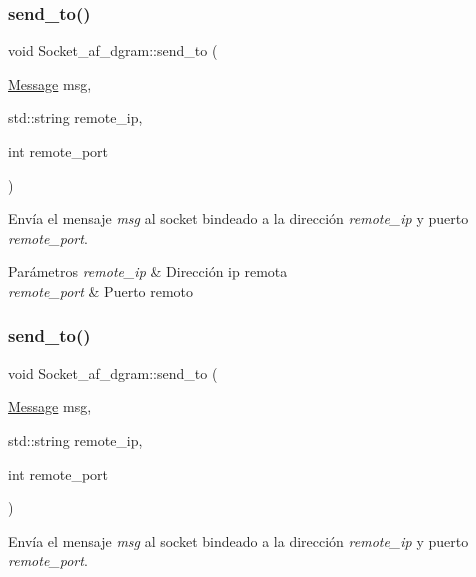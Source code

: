 \subsubsection{\texorpdfstring{send\+\_\+to()}{send\_to()}\hspace{0.1cm}{\footnotesize\ttfamily [1/2]}}
{\footnotesize\ttfamily void Socket\+\_\+af\+\_\+dgram\+::send\+\_\+to (\begin{DoxyParamCaption}\item[{\hyperlink{structMessage}{Message}}]{msg,  }\item[{std\+::string}]{remote\+\_\+ip,  }\item[{int}]{remote\+\_\+port }\end{DoxyParamCaption})}



Envía el mensaje {\itshape msg} al socket bindeado a la dirección {\itshape remote\+\_\+ip} y puerto {\itshape remote\+\_\+port}. 


\begin{DoxyParams}{Parámetros}
{\em remote\+\_\+ip} & Dirección ip remota \\
\hline
{\em remote\+\_\+port} & Puerto remoto \\
\hline
\end{DoxyParams}
\mbox{\label{classSocket__af__dgram_a744bb661eeebe5b5cdfca0028da6bd88}} 
\subsubsection{\texorpdfstring{send\+\_\+to()}{send\_to()}\hspace{0.1cm}{\footnotesize\ttfamily [2/2]}}
{\footnotesize\ttfamily void Socket\+\_\+af\+\_\+dgram\+::send\+\_\+to (\begin{DoxyParamCaption}\item[{\hyperlink{structMessage}{Message}}]{msg,  }\item[{std\+::string}]{remote\+\_\+ip,  }\item[{int}]{remote\+\_\+port }\end{DoxyParamCaption})}



Envía el mensaje {\itshape msg} al socket bindeado a la dirección {\itshape remote\+\_\+ip} y puerto {\itshape remote\+\_\+port}. 



